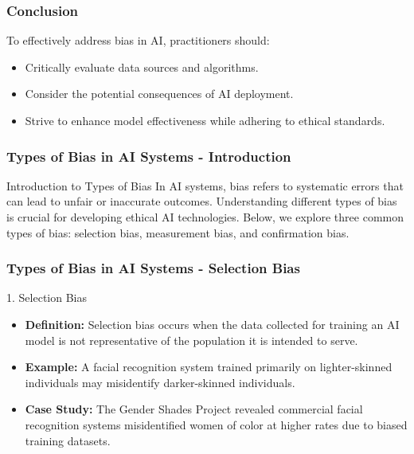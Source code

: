 \documentclass[aspectratio=169]{beamer}
\begin{document}
\begin{frame}[fragile]
    \frametitle{Conclusion}
    To effectively address bias in AI, practitioners should:
    \begin{itemize}
        \item Critically evaluate data sources and algorithms.
        \item Consider the potential consequences of AI deployment.
        \item Strive to enhance model effectiveness while adhering to ethical standards.
    \end{itemize}
\end{frame}

\begin{frame}[fragile]
    \frametitle{Types of Bias in AI Systems - Introduction}
    \begin{block}{Introduction to Types of Bias}
        In AI systems, bias refers to systematic errors that can lead to unfair or inaccurate outcomes. Understanding different types of bias is crucial for developing ethical AI technologies. Below, we explore three common types of bias: 
        selection bias, measurement bias, and confirmation bias.
    \end{block}
\end{frame}

\begin{frame}[fragile]
    \frametitle{Types of Bias in AI Systems - Selection Bias}
    \begin{block}{1. Selection Bias}
        \begin{itemize}
            \item \textbf{Definition:} Selection bias occurs when the data collected for training an AI model is not representative of the population it is intended to serve.
            \item \textbf{Example:} A facial recognition system trained primarily on lighter-skinned individuals may misidentify darker-skinned individuals.
            \item \textbf{Case Study:} The Gender Shades Project revealed commercial facial recognition systems misidentified women of color at higher rates due to biased training datasets.
        \end{itemize}
    \end{block}
\end{frame}
\end{document}
